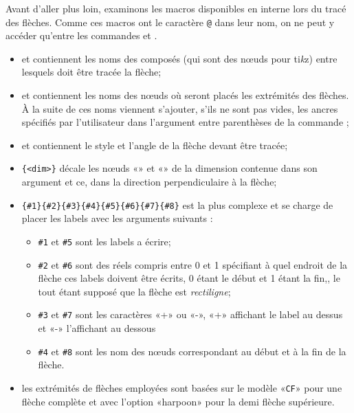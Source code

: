 \documentclass[10pt,french]{article}
\newcommand\falseverb[1]{{\ttfamily\detokenize\expandafter{\string#1}}}
\newcommand\TIKZ{ti\textit kz\xspace}
\begin{document}
Avant d'aller plus loin, examinons les macros disponibles en interne lors du tracé des flèches. Comme ces macros ont le caractère \verb-@- dans leur nom, on ne peut y accéder qu'entre les commandes \falseverb{\makeatletter} et \falseverb{\makeatother}.
\begin{itemize}
	\item \falseverb{\CF@arrow@start@name} et \falseverb{\CF@arrow@end@name} contiennent les noms des composés (qui sont des nœuds pour \TIKZ) entre lesquels doit être tracée la flèche;
	\item \falseverb{\CF@arrow@start@node} et \falseverb{\CF@arrow@end@node} contiennent les noms des nœuds où seront placés les extrémités des flèches. À la suite de ces noms viennent s'ajouter, s'ils ne sont pas vides, les ancres spécifiés par l'utilisateur dans l'argument entre parenthèses de la commande \falseverb\arrow;
	\item \falseverb{\CF@arrow@current@style} et \falseverb{\CF@arrow@current@angle} contiennent le style et l'angle de la flèche devant être tracée;
	\item \falseverb{\CF@arrow@shift@nodes}\verb-{<dim>}- décale les nœuds «\falseverb{\CF@arrow@start@node}» et «\falseverb{\CF@arrow@end@node}» de la dimension contenue dans son argument et ce, dans la direction perpendiculaire à la flèche;
	\item \falseverb{\CF@arrow@display@label}\verb/{#1}{#2}{#3}{#4}{#5}{#6}{#7}{#8}/ est la plus complexe et se charge de placer les labels avec les arguments suivants :
	\begin{itemize}
		\item \verb-#1- et \verb-#5- sont les labels a écrire;
		\item \verb-#2- et \verb-#6- sont des réels compris entre 0 et 1 spécifiant à quel endroit de la flèche ces labels doivent être écrits, 0 étant le début et 1 étant la fin,, le tout étant supposé que la flèche est \emph{rectiligne};
		\item \verb-#3- et \verb-#7- sont les caractères «+» ou «-», «+» affichant le label au dessus et «-» l'affichant au dessous
		\item \verb-#4- et \verb-#8- sont les nom des nœuds correspondant au début et à la fin de la flèche.
	\end{itemize}
	\item les extrémités de flèches employées sont basées sur le modèle «\verb-CF-» pour une flèche complète et avec l'option «harpoon» pour la demi flèche supérieure.
\end{itemize}
\end{document}
